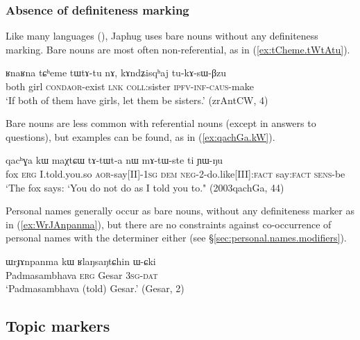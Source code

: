 \subsubsection{Absence of definiteness marking} \label{sec:non.overt.definite}
Like many languages (\citealt[130]{creissels06sgit1}), Japhug uses bare nouns without any definiteness marking. Bare nouns are most often non-referential, as  in (\ref{ex:tCheme.tWtAtu}).

\begin{exe}
\ex \label{ex:tCheme.tWtAtu}
\gll ʁnaʁna tɕʰeme tɯ\redp{}tɤ-tu nɤ, kɤndʑisqʰaj tu-kɤ-sɯ-βzu \\
both girl \textsc{cond}\redp{}\textsc{aor}-exist \textsc{lnk} \textsc{coll}:sister \textsc{ipfv}-\textsc{inf}-\textsc{caus}-make \\
\glt `If both of them have girls, let them be sisters.' (zrAntCW, 4)
\end{exe}

Bare nouns are less common with referential nouns (except in answers to questions), but examples can be found, as  in (\ref{ex:qachGa.kW}).

\begin{exe}
\ex \label{ex:qachGa.kW}
\gll qacʰɣa 	kɯ maχtɕɯ tɤ-tɯt-a nɯ mɤ-tɯ-ste ti ɲɯ-ŋu \\
fox \textsc{erg} I.told.you.so \textsc{aor}-say[II]-\textsc{1sg} \textsc{dem} \textsc{neg}-2-do.like[III]:\textsc{fact} say:\textsc{fact} \textsc{sens}-be \\
\glt `The fox says: `You do not do as I told you to." (2003qachGa, 44)
\end{exe}

Personal names generally occur as bare nouns, without any definiteness marker as in (\ref{ex:WrJAnpanma}), but there are no constraints against co-occurrence of personal names with the determiner  either (see §\ref{sec:personal.names.modifiers}).

\begin{exe}
\ex \label{ex:WrJAnpanma}
\gll  ɯrɟɤnpanma kɯ ʁlaŋsaŋtɕhin ɯ-ɕki  \\
 Padmasambhava \textsc{erg} Gesar \textsc{3sg}-\textsc{dat} \\
\glt `Padmasambhava (told) Gesar.' (Gesar, 2)
\end{exe}

 \subsection{Topic markers} \label{sec:topic}
 
